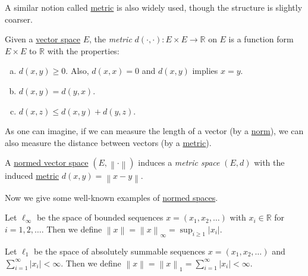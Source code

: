 A similar notion called \hyperref[prev:metric]{metric} is also widely used, though the structure is slightly coarser.

\begin{prev}[Metric]\label{prev:metric}
	Given a \hyperref[def:linear-vector-space]{vector space} \(E\), the \emph{metric} \(d(\cdot, \cdot)\colon E\times E\to \mathbb{R} \) on \(E\) is a function form \(E\times E\) to \(\mathbb{R} \) with the properties:
	\begin{enumerate}[(a)]
		\item \(d(x, y) \geq 0\). Also, \(d(x, x) = 0\) and \(d(x, y)\) implies \(x =y\).
		\item \(d(x, y) = d(y, x)\).
		\item \(d(x, z) \leq d(x, y) + d(y, z)\).
	\end{enumerate}
\end{prev}

As one can imagine, if we can measure the length of a vector (by a \hyperref[def:norm]{norm}), we can also measure the distance between vectors (by a \hyperref[prev:metric]{metric}).

\begin{remark}
	A \hyperref[def:normed-vector-space]{normed vector space} \((E, \left\lVert \cdot\right\rVert )\) induces a \emph{metric space} \((E, d)\) with the induced \hyperref[prev:metric]{metric} \(d(x, y) = \left\lVert x- y\right\rVert \).
\end{remark}

Now we give some well-known examples of \hyperref[def:normed-vector-space]{normed spaces}.

\begin{eg}
	Let \(\ell _\infty \) be the space of bounded sequences \(x = (x_1, x_2, \dots )\) with \(x_i\in \mathbb{R} \) for \(i = 1, 2, \dots \). Then we define \(\left\lVert x\right\rVert = \left\lVert x\right\rVert _\infty = \sup _{i \geq 1}\left\vert x_i \right\vert \).
\end{eg}

\begin{eg}
	Let \(\ell _1\) be the space of absolutely summable sequences \(x = (x_1, x_2, \dots)\) and \(\sum_{i=1}^{\infty} \left\vert x_i \right\vert < \infty\). Then we define \(\left\lVert x\right\rVert = \left\lVert x\right\rVert _1 = \sum_{i=1}^{\infty} \left\vert x_i \right\vert < \infty\).
\end{eg}


